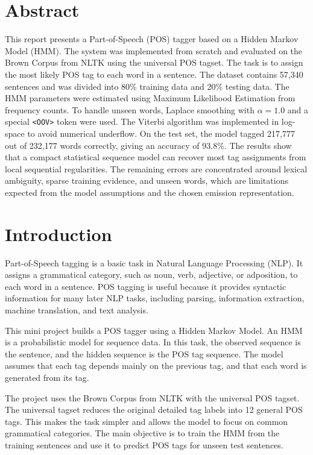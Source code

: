 \documentclass[12pt,a4paper]{article}
\newcommand{\sectionbreakguard}{\Needspace{8\baselineskip}}
\begin{document}
\section{Abstract}

This report presents a Part-of-Speech (POS) tagger based on a Hidden Markov Model
(HMM). The system was implemented from scratch and evaluated on the Brown Corpus
from NLTK using the universal POS tagset. The task is to assign the most likely
POS tag to each word in a sentence. The dataset contains 57,340 sentences and was
divided into 80\% training data and 20\% testing data. The HMM parameters were
estimated using Maximum Likelihood Estimation from frequency counts. To handle
unseen words, Laplace smoothing with $\alpha = 1.0$ and a special
\texttt{\textless OOV\textgreater} token were used. The Viterbi algorithm was
implemented in log-space to avoid numerical underflow. On the test set, the model
tagged 217,777 out of 232,177 words correctly, giving an accuracy of 93.8\%.
The results show that a compact statistical sequence model can recover most tag
assignments from local sequential regularities. The remaining errors are
concentrated around lexical ambiguity, sparse training evidence, and unseen
words, which are limitations expected from the model assumptions and the chosen
emission representation.

\sectionbreakguard
\section{Introduction}

Part-of-Speech tagging is a basic task in Natural Language Processing (NLP). It
assigns a grammatical category, such as noun, verb, adjective, or adposition, to
each word in a sentence. POS tagging is useful because it provides syntactic
information for many later NLP tasks, including parsing, information extraction,
machine translation, and text analysis.

This mini project builds a POS tagger using a Hidden Markov Model. An HMM is a
probabilistic model for sequence data. In this task, the observed sequence is the
sentence, and the hidden sequence is the POS tag sequence. The model assumes that
each tag depends mainly on the previous tag, and that each word is generated from
its tag.

The project uses the Brown Corpus from NLTK with the universal POS tagset. The
universal tagset reduces the original detailed tag labels into 12 general POS
tags. This makes the task simpler and allows the model to focus on common
grammatical categories. The main objective is to train the HMM from the training
sentences and use it to predict POS tags for unseen test sentences.
\end{document}
